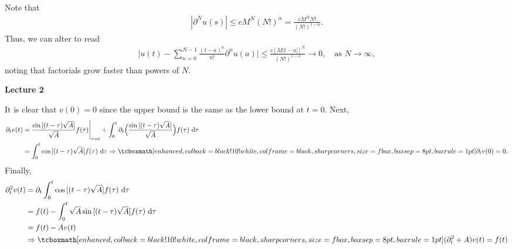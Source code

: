 Note that
\begin{eqnarray}
    \label{eq:condition-rearrange}
|\partial^{N}u(s)| \leq c M^{N} (N!)^{\alpha} = \frac{c M^{N} N!}{(N!)^{1-\alpha}}
.\end{eqnarray}
Thus, we can alter  to read
\begin{eqnarray}
    \label{eq:taylor-abs-val-3}
    \Bigg| u(t) - \sum_{n=0}^{N-1} \frac{(t-a)^{n}}{n!}\partial^{n}u(a)  \Bigg| \leq \frac{c[M|t-a|]^{N}}{(N!)^{1-\alpha}} \rightarrow 0, \quad \mbox{as } N \rightarrow \infty 
,\end{eqnarray}
noting that factorials grow faster than powers of $N$.

\textbf{\large Lecture 2}


It is clear that $v(0) = 0$ since the upper bound is the same as the lower bound at $t = 0$.
Next, 
\begin{align}
    \label{eq:derivative-at-0}
    \partial_{t}v(t) &= \frac{\sin{[(t-\tau)\sqrt{A}]}}{\sqrt{A}}f(\tau)\Bigg|_{\tau=t} + \int_{0}^{t}\partial_{t}\Big(\frac{\sin{[(t-\tau)\sqrt{A}]}}{\sqrt{A}}\Big)f(\tau)\, \dd{\tau} \notag \\
                     &= \int_{0}^{t} \cos{[(t-\tau)\sqrt{A}]}f(\tau)\,\dd{\tau} \Rightarrow \eqbox{\partial_{t}v(0) = 0}
.\end{align}
Finally,
\begin{align}
    \label{eq:v''}
    \partial_{t}^2v(t) &= \partial_{t} \int_{0}^{t} \cos{[(t-\tau)\sqrt{A}]}f(\tau)\, \dd{\tau} \notag \\
                       &= f(t) - \int_{0}^{t} \sqrt{A}\sin{[(t-\tau)\sqrt{A}]}f(\tau)\,\dd{\tau} \notag \\
                       &= f(t) - A v(t) \notag \\
                       &\Rightarrow \eqbox{(\partial_{t}^2+A)v(t) = f(t)}
\end{align}



